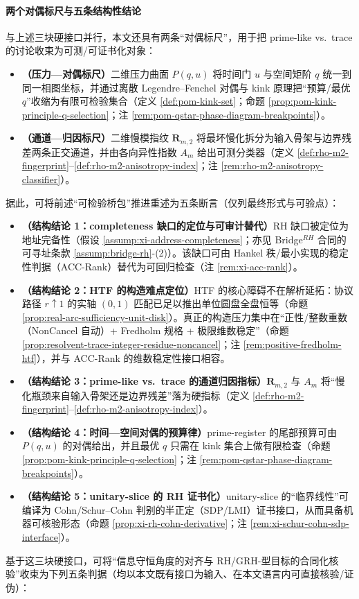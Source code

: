 \paragraph{两个对偶标尺与五条结构性结论}
与上述三块硬接口并行，本文还具有两条“对偶标尺”，用于把 prime-like vs.\ trace 的讨论收束为可测/可证书化对象：
\begin{itemize}
  \item \textbf{（压力—对偶标尺）}二维压力曲面 \(P(q,u)\) 将时间门 \(u\) 与空间矩阶 \(q\) 统一到同一相图坐标，并通过离散 Legendre--Fenchel 对偶与 kink 原理把“预算/最优 \(q\)”收缩为有限可检验集合（定义 \ref{def:pom-kink-set}；命题 \ref{prop:pom-kink-principle-q-selection}；注 \ref{rem:pom-qstar-phase-diagram-breakpoints}）。
  \item \textbf{（通道—归因标尺）}二维慢模指纹 \(\mathbf{R}_{m,2}\) 将最坏慢化拆分为输入骨架与边界残差两条正交通道，并由各向异性指数 \(A_m\) 给出可测分类器（定义 \ref{def:rho-m2-fingerprint}--\ref{def:rho-m2-anisotropy-index}；注 \ref{rem:rho-m2-anisotropy-classifier}）。
\end{itemize}
据此，可将前述“可检验桥包”推进重述为五条断言（仅列最终形式与可验点）：
\begin{itemize}
  \item \textbf{（结构结论 1：completeness 缺口的定位与可审计替代）}RH 缺口被定位为地址完备性（假设 \ref{assump:xi-address-completeness}；亦见 Bridge\(^{RH}\) 合同的可寻址条款 \ref{assump:bridge-rh}-(2)）。该缺口可由 Hankel 秩/最小实现的稳定性判据（ACC-Rank）替代为可回归检查（注 \ref{rem:xi-acc-rank}）。
  \item \textbf{（结构结论 2：HTF 的构造难点定位）}HTF 的核心障碍不在解析延拓：协议路径 \(r\uparrow 1\) 的实轴 \((0,1)\) 匹配已足以推出单位圆盘全盘恒等（命题 \ref{prop:real-arc-sufficiency-unit-disk}）。真正的构造压力集中在“正性/整数重数（NonCancel 自动）+ Fredholm 规格 + 极限维数稳定”（命题 \ref{prop:resolvent-trace-integer-residue-noncancel}；注 \ref{rem:positive-fredholm-htf}），并与 ACC-Rank 的维数稳定性接口相容。
  \item \textbf{（结构结论 3：prime-like vs.\ trace 的通道归因指标）}\(\mathbf{R}_{m,2}\) 与 \(A_m\) 将“慢化瓶颈来自输入骨架还是边界残差”落为硬指标（定义 \ref{def:rho-m2-fingerprint}--\ref{def:rho-m2-anisotropy-index}）。
  \item \textbf{（结构结论 4：时间—空间对偶的预算律）}prime-register 的尾部预算可由 \(P(q,u)\) 的对偶给出，并且最优 \(q\) 只需在 kink 集合上做有限检查（命题 \ref{prop:pom-kink-principle-q-selection}；注 \ref{rem:pom-qstar-phase-diagram-breakpoints}）。
  \item \textbf{（结构结论 5：unitary-slice 的 RH 证书化）}unitary-slice 的“临界线性”可编译为 Cohn/Schur--Cohn 判别的半正定（SDP/LMI）证书接口，从而具备机器可核验形态（命题 \ref{prop:xi-rh-cohn-derivative}；注 \ref{rem:xi-schur-cohn-sdp-interface}）。
\end{itemize}
基于这三块硬接口，可将“信息守恒角度的对齐与 RH/GRH-型目标的合同化核验”收束为下列五条判据（均以本文既有接口为输入、在本文语言内可直接核验/证伪）：

